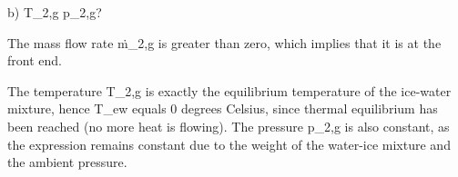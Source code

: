 b) T_{2,g} p_{2,g}?

The mass flow rate ṁ_{2,g} is greater than zero, which implies that it is at the front end.

The temperature T_{2,g} is exactly the equilibrium temperature of the ice-water mixture, hence T_{ew} equals 0 degrees Celsius, since thermal equilibrium has been reached (no more heat is flowing). The pressure p_{2,g} is also constant, as the expression remains constant due to the weight of the water-ice mixture and the ambient pressure.